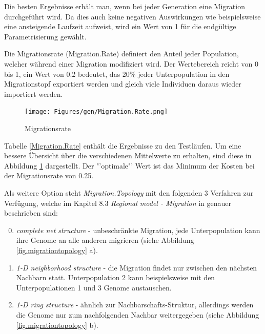 


\noindent Die besten Ergebnisse erhält man, wenn bei jeder Generation eine
Migration durchgeführt wird. Da dies auch keine negativen Auswirkungen wie
beispielsweise eine ansteigende Laufzeit aufweist, wird ein Wert von 1 für die
endgültige Parametrisierung gewählt.


Die Migrationsrate (Migration.Rate) definiert den Anteil jeder Population, welcher
während einer Migration modifiziert wird. Der Wertebereich reicht von 0 bis 1,
ein Wert von 0.2 bedeutet, das 20\% jeder Unterpopulation in den Migrationstopf
exportiert werden und gleich viele Individuen daraus wieder importiert werden.


\begin{figure}[h!]
  \centering
  \texttt{[image: Figures/gen/Migration.Rate.png]}
  \caption{Migrationsrate}\label{fig.migrationrate}
\end{figure}

\noindent Tabelle \ref{Migration.Rate} enthält die Ergebnisse zu den Testläufen.
Um eine bessere Übersicht über die verschiedenen Mittelwerte zu erhalten, sind
diese in Abbildung \ref{fig.migrationrate} dargestellt. Der "'optimale"' Wert
ist das Minimum der Kosten bei der Migrationsrate von 0.25.


Als weitere Option steht \emph{Migration.Topology} mit den folgenden 3 Verfahren
zur Verfügung, welche im Kapitel 8.3 \emph{Regional model - Migration} in
\citep{geatbx-ea} genauer beschrieben sind:
\begin{enumerate}
\setcounter{enumi}{-1} %
\item \emph{complete net structure} - unbeschränkte Migration, jede
      Unterpopulation kann ihre Genome an alle anderen migrieren (siehe Abbildung
      \ref{fig.migrationtopology} a).
\item \emph{1-D neighborhood structure} - die Migration findet nur zwischen den
      nächsten Nachbarn statt. Unterpopulation 2 kann beispielsweise mit den
      Unterpopulationen 1 und 3 Genome austauschen.
\item \emph{1-D ring structure} - ähnlich zur Nachbarschafts-Struktur, allerdings
      werden die Genome nur zum nachfolgenden Nachbar weitergegeben (siehe Abbildung
      \ref{fig.migrationtopology} b).
\end{enumerate}


